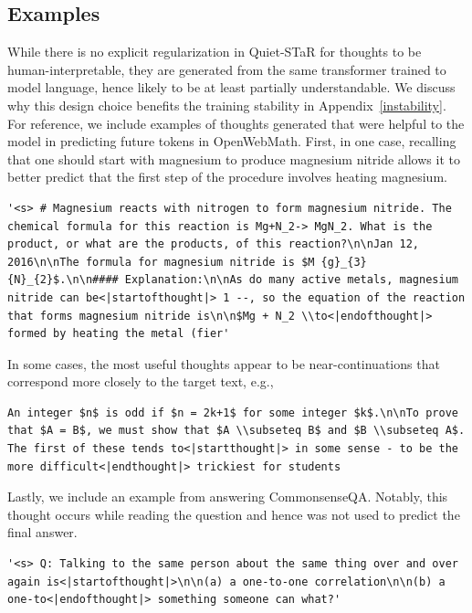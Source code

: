 \documentclass{article} %
\begin{document}
\subsection{Examples}
\lstset{
  basicstyle=\ttfamily,
  columns=fixed,
  fontadjust=true,
  basewidth=0.5em,
  breaklines=True
}

While there is no explicit regularization in Quiet-STaR for thoughts to be human-interpretable, they are generated from the same transformer trained to model language, hence likely to be at least partially understandable. We discuss why this design choice benefits the training stability in Appendix~\ref{instability}.
For reference, we include examples of thoughts generated that were helpful to the model in predicting future tokens in OpenWebMath. First, in one case, recalling that one should start with magnesium to produce magnesium nitride allows it to better predict that the first step of the procedure involves heating magnesium.

\begin{lstlisting}
'<s> # Magnesium reacts with nitrogen to form magnesium nitride. The chemical formula for this reaction is Mg+N_2-> MgN_2. What is the product, or what are the products, of this reaction?\n\nJan 12, 2016\n\nThe formula for magnesium nitride is $M {g}_{3} {N}_{2}$.\n\n#### Explanation:\n\nAs do many active metals, magnesium nitride can be<|startofthought|> 1 --, so the equation of the reaction that forms magnesium nitride is\n\n$Mg + N_2 \\to<|endofthought|> formed by heating the metal (fier' \end{lstlisting}

In some cases, the most useful thoughts appear to be near-continuations that correspond more closely to the target text, e.g.,

\begin{lstlisting}
An integer $n$ is odd if $n = 2k+1$ for some integer $k$.\n\nTo prove that $A = B$, we must show that $A \\subseteq B$ and $B \\subseteq A$. The first of these tends to<|startthought|> in some sense - to be the more difficult<|endthought|> trickiest for students
\end{lstlisting}

Lastly, we include an example from answering CommonsenseQA. Notably, this thought occurs while reading the question and hence was not used to predict the final answer.
\begin{lstlisting}
'<s> Q: Talking to the same person about the same thing over and over again is<|startofthought|>\n\n(a) a one-to-one correlation\n\n(b) a one-to<|endofthought|> something someone can what?'
\end{lstlisting}
\end{document}
